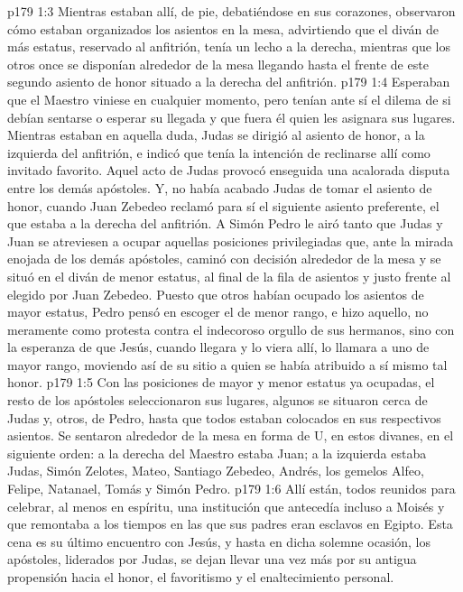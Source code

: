 \vs p179 1:3 Mientras estaban allí, de pie, debatiéndose en sus corazones, observaron cómo estaban organizados los asientos en la mesa, advirtiendo que el diván de más estatus, reservado al anfitrión, tenía un lecho a la derecha, mientras que los otros once se disponían alrededor de la mesa llegando hasta el frente de este segundo asiento de honor situado a la derecha del anfitrión.
\vs p179 1:4 Esperaban que el Maestro viniese en cualquier momento, pero tenían ante sí el dilema de si debían sentarse o esperar su llegada y que fuera él quien les asignara sus lugares. Mientras estaban en aquella duda, Judas se dirigió al asiento de honor, a la izquierda del anfitrión, e indicó que tenía la intención de reclinarse allí como invitado favorito. Aquel acto de Judas provocó enseguida una acalorada disputa entre los demás apóstoles. Y, no había acabado Judas de tomar el asiento de honor, cuando Juan Zebedeo reclamó para sí el siguiente asiento preferente, el que estaba a la derecha del anfitrión. A Simón Pedro le airó tanto que Judas y Juan se atreviesen a ocupar aquellas posiciones privilegiadas que, ante la mirada enojada de los demás apóstoles, caminó con decisión alrededor de la mesa y se situó en el diván de menor estatus, al final de la fila de asientos y justo frente al elegido por Juan Zebedeo. Puesto que otros habían ocupado los asientos de mayor estatus, Pedro pensó en escoger el de menor rango, e hizo aquello, no meramente como protesta contra el indecoroso orgullo de sus hermanos, sino con la esperanza de que Jesús, cuando llegara y lo viera allí, lo llamara a uno de mayor rango, moviendo así de su sitio a quien se había atribuido a sí mismo tal honor.
\vs p179 1:5 Con las posiciones de mayor y menor estatus ya ocupadas, el resto de los apóstoles seleccionaron sus lugares, algunos se situaron cerca de Judas y, otros, de Pedro, hasta que todos estaban colocados en sus respectivos asientos. Se sentaron alrededor de la mesa en forma de U, en estos divanes, en el siguiente orden: a la derecha del Maestro estaba Juan; a la izquierda estaba Judas, Simón Zelotes, Mateo, Santiago Zebedeo, Andrés, los gemelos Alfeo, Felipe, Natanael, Tomás y Simón Pedro.
\vs p179 1:6 \pc Allí están, todos reunidos para celebrar, al menos en espíritu, una institución que antecedía incluso a Moisés y que remontaba a los tiempos en las que sus padres eran esclavos en Egipto. Esta cena es su último encuentro con Jesús, y hasta en dicha solemne ocasión, los apóstoles, liderados por Judas, se dejan llevar una vez más por su antigua propensión hacia el honor, el favoritismo y el enaltecimiento personal.
